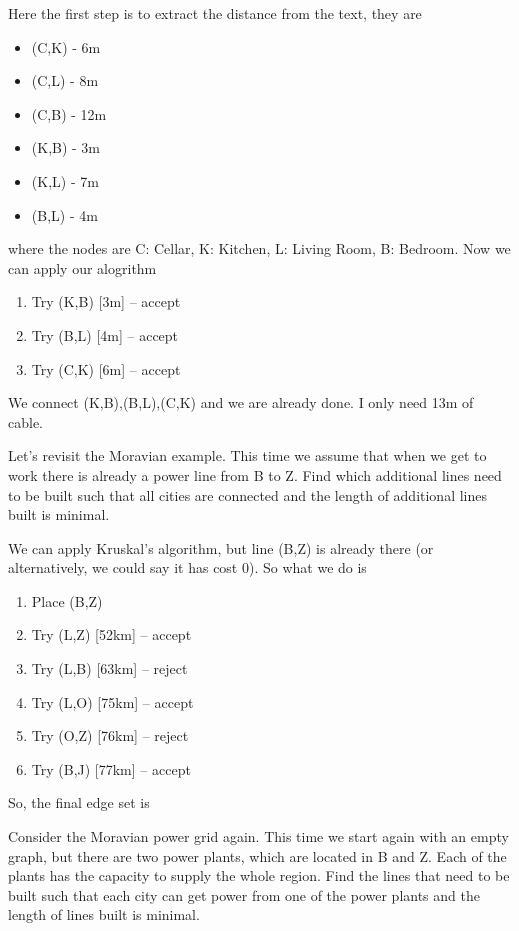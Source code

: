 \solution
Here the first step is to extract the distance from the text, they are 
\begin{itemize}
\item (C,K) - 6m
\item (C,L) - 8m
\item (C,B) - 12m
\item (K,B) - 3m
\item (K,L) - 7m
\item (B,L) - 4m
\end{itemize}
where the nodes are C: Cellar, K: Kitchen, L: Living Room, B: Bedroom. Now we can apply our alogrithm
\begin{enumerate}
\item Try (K,B) [3m] -- accept
\item Try (B,L) [4m] -- accept
\item Try (C,K) [6m] -- accept
\end{enumerate}
We connect (K,B),(B,L),(C,K) and we are already done. I only need 13m of cable.



Let's revisit the Moravian example. This time we assume that when we get to work there is already a power line from B to Z. Find which additional lines need to be built such that all cities are connected and the length of additional lines built is minimal. 


\solution
We can apply Kruskal's algorithm, but line (B,Z) is already there (or alternatively, we could say it has cost 0). So what we do is
\begin{enumerate}
\item Place (B,Z)
\item Try (L,Z) [52km] -- accept
\item Try (L,B) [63km] -- reject
\item Try (L,O) [75km] -- accept
\item Try (O,Z) [76km] -- reject
\item Try (B,J) [77km] -- accept
\end{enumerate}
So, the final edge set is 



Consider the Moravian power grid again. This time we start again with an empty graph, but there are two power plants, which are located in B and Z. Each of the plants has the capacity to supply the whole region. Find the lines that need to be built such that each city can get power from one of the power plants and the length of lines built is minimal. 

